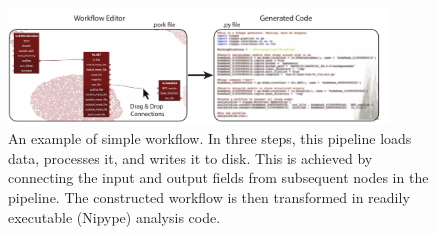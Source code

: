 \begin{figure}[!ht]
	\centering
	\includegraphics[width=0.9\textwidth, clip=true]{./Chapters/05_Porcupine/./Images/pork_py.pdf}
	\caption{An example of simple workflow. In three steps, this pipeline loads data, processes it, and writes it to disk. This is achieved by connecting the input and output fields from subsequent nodes in the pipeline. The constructed workflow is then transformed in readily executable (Nipype) analysis code.}
	\label{fig:porcupine-simple}
\end{figure}
